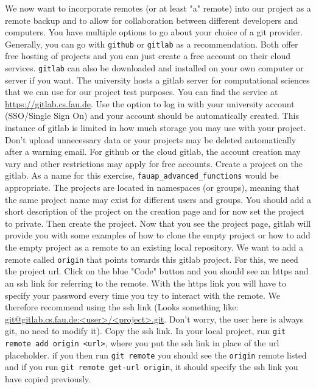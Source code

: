 \documentclass[]{erlangen-problemset}
\begin{document}
\begin{problem}[title={Dealing with remotes}]
\noindent We now want to incorporate remotes (or at least "a" remote) into our project as a remote backup and to allow for collaboration between different developers and computers. 
You have multiple options to go about your choice of a git provider. 
Generally, you can go with \texttt{github} or \texttt{gitlab} as a recommendation. 
Both offer free hosting of projects and you can just create a free account on their cloud services. 
\texttt{gitlab} can also be downloaded and installed on your own computer or server if you want.
\Question The university hosts a gitlab server for computational sciences that we can use for our project test purposes. 
You can find the service at \url{https://gitlab.cs.fau.de}. 
Use the option to log in with your university account (SSO/Single Sign On) and your account should be automatically created.
This instance of gitlab is limited in how much storage you may use with your project. 
Don't upload unnecessary data or your projects may be deleted automatically after a warning email.
For github or the cloud gitlab, the account creation may vary and other restrictions may apply for free accounts.
\Question Create a project on the gitlab. As a name for this exercise, \texttt{fauap\_advanced\_functions} would be appropriate. 
The projects are located in namespaces (or groups), meaning that the same project name may exist for different users and groups. 
You should add a short description of the project on the creation page and for now set the project to private. 
Then create the project.
\Question Now that you see the project page, gitlab will provide you with some examples of how to clone the empty project or how to add the empty project as a remote to an existing local repository. 
We want to add a remote called \texttt{origin} that points towards this gitlab project. 
For this, we need the project url. 
Click on the blue "Code" button and you should see an https and an ssh link for referring to the remote. 
With the https link you will have to specify your password every time you try to interact with the remote. 
We therefore recommend using the ssh link (Looks something like: \url{git@gitlab.cs.fau.de:<user>/<project>.git}. Don't worry, the user here is always git, no need to modify it). Copy the ssh link.
In your local project, run \texttt{git remote add origin <url>}, where you put the ssh link in place of the url placeholder. 
if you then run \texttt{git remote} you should see the \texttt{origin} remote listed and if you run \texttt{git remote get-url origin}, it should specify the ssh link you have copied previously.

\end{problem}
\end{document}
